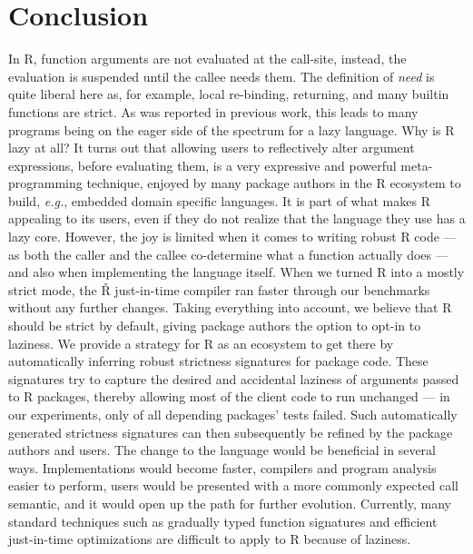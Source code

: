 \documentclass[review,creen,acmsmall]{acmart}
\renewcommand{\Rsh}{{\sf\v R}\xspace}
\newcommand{\eg}{\emph{e.g.},\xspace}
\begin{document}
\section{Conclusion}\label{sec:conclusion}

In R, function arguments are not evaluated at the call-site, instead, the
evaluation is suspended until the callee needs them. The definition of
\emph{need} is quite liberal here as, for example, local re-binding, returning,
and many builtin functions are strict. As was reported in previous work, this
leads to many programs being on the eager side of the spectrum for a lazy
language. Why is R lazy at all? It turns out that allowing users to reflectively
alter argument expressions, before evaluating them, is a very expressive and
powerful meta-programming technique, enjoyed by many package authors in the R
ecosystem to build, \eg embedded domain specific languages. It is part of
what makes R appealing to its users, even if they do not realize that the
language they use has a lazy core. However, the joy is limited when it comes to
writing robust R code --- as both the caller and the callee co-determine what a function
actually does --- and also when implementing the language itself. When we turned
R into a mostly strict mode, the \Rsh just-in-time compiler ran
\speedupRshStrict faster through our benchmarks without any further changes.
Taking everything into account, we believe that R should be strict by default,
giving package authors the option to opt-in to laziness. We provide a strategy
for R as an ecosystem to get there by automatically inferring robust strictness
signatures for package code. These signatures try to capture the desired and
accidental laziness of arguments passed to R packages, thereby allowing most of
the client code to run unchanged --- in our experiments, only \robustnesResult of
all depending packages' tests failed. Such automatically generated strictness
signatures can then subsequently be refined by the package authors and users.
The change to the language would be beneficial in several ways. Implementations
would become faster, compilers and program analysis easier to perform, users
would be presented with a more commonly expected call semantic, and it would open
up the path for further evolution. Currently, many standard techniques such as
gradually typed function signatures and efficient just-in-time optimizations are
difficult to apply to R because of laziness.


\end{document}
